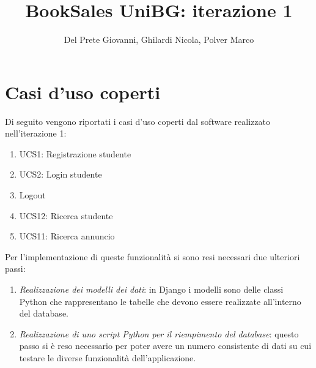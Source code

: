 \documentclass[10pt,a4paper]{report}
\author{Del Prete Giovanni, Ghilardi Nicola, Polver Marco}
\title{BookSales UniBG: iterazione 1}
\begin{document}
	
	\maketitle
	\tableofcontents
	
	\section{Casi d'uso coperti}
	Di seguito vengono riportati i casi d'uso coperti dal software realizzato nell'iterazione 1:
	\begin{enumerate}
		\item UCS1: Registrazione studente
		\item UCS2: Login studente
		\item Logout
		\item UCS12: Ricerca studente
		\item UCS11: Ricerca annuncio
	\end{enumerate}
	Per l'implementazione di queste funzionalità si sono resi necessari due ulteriori passi:
	\begin{enumerate}
		\item \textit{Realizzazione dei modelli dei dati}: in Django i modelli sono delle classi Python che rappresentano le tabelle che devono essere realizzate all'interno del database.
		\item \textit{Realizzazione di uno script Python per il riempimento del database}: questo passo si è reso necessario per poter avere un numero consistente di dati su cui testare le diverse funzionalità dell'applicazione.
	\end{enumerate}
\end{document}
